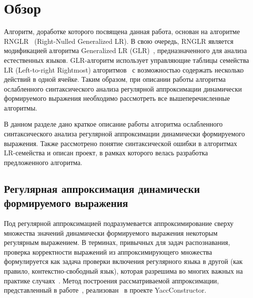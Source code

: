 
\section{Обзор}
Алгоритм, доработке которого посвящена данная работа, основан на алгоритме RNGLR~\cite{RNGLR} (Right-Nulled Generalized LR). В свою очередь, RNGLR является модификацией алгоритма Generalized LR (GLR)~\cite{Tomita}, предназначенного для анализа естественных языков. GLR-алгоритм использует управляющие таблицы семейства LR (Left-to-right Rightmost) алгоритмов~\cite{Grune} с возможностью содержать несколько действий в одной ячейке. Таким образом, при описании работы алгоритма ослабленного синтаксического анализа регулярной аппроксимации динамически формируемого выражения необходимо рассмотреть все вышеперечисленные алгоритмы.

В данном разделе дано краткое описание работы алгоритма ослабленного синтаксического анализа регулярной аппроксимации динамически формируемого выражения. Также рассмотрено понятие синтаксической ошибки в алгоритмах LR-семейства и описан проект, в рамках которого велась разработка предложенного алгоритма.

\subsection{Регулярная аппроксимация динамически формируемого выражения}
Под регулярной аппроксимацией подразумевается аппроксимирование сверху множества значений динамически формируемого выражения некоторым регулярным выражением. В терминах, привычных для задач распознавания, проверка корректности выражений из аппроксимирующего множества формулируется как задача проверки включения регулярного языка в другой (как правило, контекстно-свободный язык), которая разрешима во многих важных на практике случаях~\cite{LangInclusion}. Метод построения рассматриваемой аппроксимации, представленный в работе~\cite{RegOverApprox}, реализован~\cite{YCregapprox} в проекте YaccConstructor.

